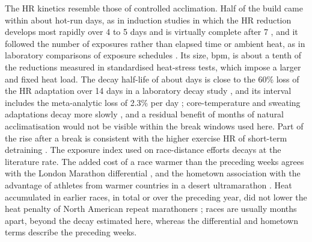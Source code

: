 \documentclass[12pt]{article}
\begin{document}
The HR kinetics resemble those of controlled acclimation. Half of the build came within about \kinBuildRound{} hot-run days, as in induction studies in which the HR reduction develops most rapidly over 4 to 5 days and is virtually complete after 7 \cite{periard2015,pandolf1998}, and it followed the number of exposures rather than elapsed time or ambient heat, as in laboratory comparisons of exposure schedules \cite{willmott2018,stevens2025}. Its size, \kinOnsetDecline{} bpm, is about a tenth of the reductions measured in standardised heat-stress tests, which impose a larger and fixed heat load. The decay half-life of about \kinDecayRound{} days is close to the 60\% loss of the HR adaptation over 14 days in a laboratory decay study \cite{flouris2014}, and its interval includes the meta-analytic loss of 2.3\% per day \cite{daanen2018art}; core-temperature and sweating adaptations decay more slowly \cite{weller2007,poirier2015}, and a residual benefit of months of natural acclimatisation \cite{malgoyre2020} would not be visible within the break windows used here. Part of the rise after a break is consistent with the higher exercise HR of short-term detraining \cite{mujika2000}. The exposure index used on race-distance efforts decays at the literature rate. The added cost of a race warmer than the preceding weeks agrees with the London Marathon differential \cite{vernon2021}, and the hometown association with the advantage of athletes from warmer countries in a desert ultramarathon \cite{ioannou2018}. Heat accumulated in earlier races, in total or over the preceding year, did not lower the heat penalty of North American repeat marathoners \cite{oliveira2026}; races are usually months apart, beyond the decay estimated here, whereas the differential and hometown terms describe the preceding weeks.
\end{document}
